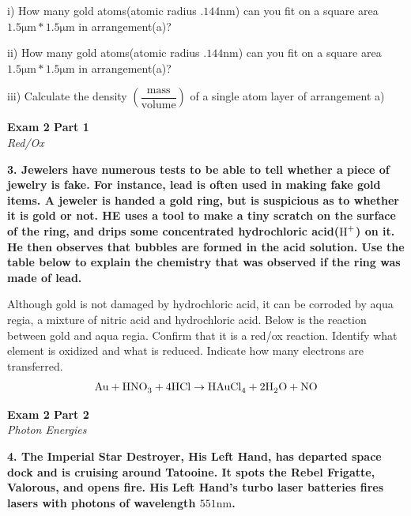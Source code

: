 \documentclass{article}
\begin{document}
    i) How many gold atoms(atomic radius $.144 \si{\nano\metre}$) can you fit on a square area $1.5 \si{\micro\metre} * 1.5 \si{\micro\metre}$ in arrangement(a)?

    ii) How many gold atoms(atomic radius $.144 \si{\nano\metre}$) can you fit on a square area $1.5 \si{\micro\metre} * 1.5 \si{\micro\metre}$ in arrangement(a)?

    iii) Calculate the density $(\dfrac{\text{mass}}{\text{volume}})$ of a single atom layer of arrangement a)

    \pagebreak

    \begin{center}
        \textbf{Exam 2 Part 1}\\
        \textit{Red/Ox}
    \end{center}
    \textbf{3. Jewelers have numerous tests to be able to tell whether a piece of jewelry is fake. For instance, lead is often used in making fake gold items. A jeweler is handed a gold ring, but is suspicious as to whether it is gold or not. HE uses a tool to make a tiny scratch on the surface of the ring, and drips some concentrated hydrochloric acid($\ce{H^{+}}$) on it. He then observes that bubbles are formed in the acid solution. Use the table below to explain the chemistry that was observed if the ring was made of lead.}

    Although gold is not damaged by hydrochloric acid, it can be corroded by aqua regia, a mixture of nitric acid and hydrochloric acid. Below is the reaction between gold and aqua regia. Confirm that it is a red/ox reaction. Identify what element is oxidized and what is reduced. Indicate how many electrons are transferred.
    $$\ce{Au} + \ce{HNO_{3}} + \ce{4 HCl} \rightarrow \ce{HAuCl_{4}} + \ce{2 H_{2}O} + \ce{NO}$$

    \pagebreak

    \begin{center}
        \textbf{Exam 2 Part 2}\\
        \textit{Photon Energies}
    \end{center}
    \textbf{4. The Imperial Star Destroyer, His Left Hand, has departed space dock and is cruising around Tatooine. It spots the Rebel Frigatte, Valorous, and opens fire. His Left Hand's turbo laser batteries fires lasers with photons of wavelength $551 \si{\nano\meter}$.}
\end{document}
